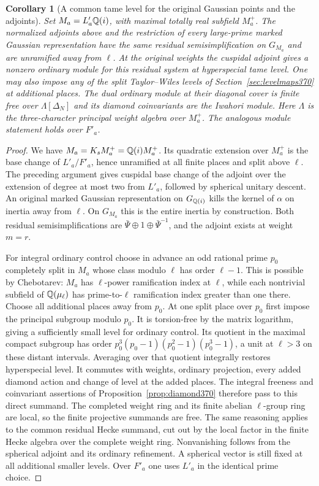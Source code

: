 \documentclass[a4paper,11pt]{article}
\newtheorem{corollary}[proposition]{Corollary}
\theoremstyle{definition}
\theoremstyle{remark}
\numberwithin{equation}{section}
\begin{document}
\begin{corollary}[A common tame level for the original Gaussian points and the adjoints]\leavevmode
\label{cor:onelevel404}
Set \(M_a=L'_a\mathbb Q(i)\), with maximal totally real subfield \(M_a^+\).
The normalized adjoints above and the restriction of every
large-prime marked Gaussian representation have the same
residual semisimplification on \(G_{M_a}\) and are unramified
away from \(\ell\). At the original weights the cuspidal adjoint
gives a nonzero ordinary module for this residual system at
hyperspecial tame level. One may also impose any of the split
Taylor--Wiles levels of Section~\ref{sec:levelmaps370} at additional
places. The dual ordinary module at their diagonal cover is
finite free over \(\Lambda[\Delta_N]\) and its diamond
coinvariants are the Iwahori module. Here \(\Lambda\) is the
three-character principal weight algebra over \(M_a^+\).
The analogous module statement holds over \(F'_a\).
\end{corollary}
\begin{proof}
We have \(M_a=K_s M_a^+=\mathbb Q(i)M_a^+\). Its quadratic extension
over \(M_a^+\) is the base change of \(L'_a/F'_a\), hence
unramified at all finite places and split above \(\ell\).
The preceding argument gives cuspidal base change of the adjoint
over the extension of degree at most two from \(L'_a\), followed
by spherical unitary descent. An original marked Gaussian
representation on \(G_{\mathbb Q(i)}\) kills the kernel of \(\alpha\)
on inertia away from \(\ell\). On \(G_{M_a}\) this is the
entire inertia by construction. Both residual semisimplifications
are \(\bar\Psi\oplus1\oplus\bar\Psi^{-1}\), and the adjoint
exists at weight \(m=r\).

For integral ordinary control choose in advance an odd rational
prime \(p_0\) completely split in \(M_a\) whose class modulo
\(\ell\) has order \(\ell-1\). This is possible by Chebotarev:
\(M_a\) has \(\ell\)-power ramification index at \(\ell\), while
each nontrivial subfield of \(\mathbb Q(\mu_\ell)\) has prime-to-\(\ell\)
ramification index greater than one there. Choose all additional
places away from \(p_0\). At one split place over \(p_0\)
first impose the principal subgroup modulo \(p_0\).
It is torsion-free by the matrix logarithm, giving a sufficiently
small level for ordinary control. Its quotient in the maximal
compact subgroup has order
\(p_0^3(p_0-1)(p_0^2-1)(p_0^3-1)\), a unit at \(\ell>3\)
on these distant intervals. Averaging over that quotient
integrally restores hyperspecial level. It commutes with weights,
ordinary projection, every added diamond action and change
of level at the added places. The integral freeness and
coinvariant assertions of Proposition~\ref{prop:diamond370}
therefore pass to this direct summand. The completed weight
ring and its finite abelian \(\ell\)-group ring are local, so
the finite projective summands are free. The same reasoning
applies to the common residual Hecke summand, cut out by the
local factor in the finite Hecke algebra over the complete
weight ring. Nonvanishing follows from the spherical adjoint
and its ordinary refinement. A spherical vector is still
fixed at all additional smaller levels. Over \(F'_a\) one uses
\(L'_a\) in the identical prime choice.
\end{proof}
\end{document}
